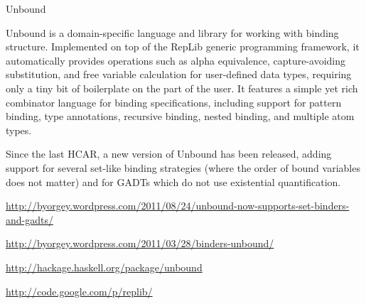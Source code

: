 \begin{hcarentry}[updated]{Unbound}
\makeheader

Unbound is a domain-specific language and library for working with
binding structure.  Implemented on top of the RepLib generic
programming framework, it automatically provides operations such as
alpha equivalence, capture-avoiding substitution, and free variable
calculation for user-defined data types, requiring only a tiny bit of
boilerplate on the part of the user.  It features a simple yet rich
combinator language for binding specifications, including support for
pattern binding, type annotations, recursive binding, nested binding,
and multiple atom types.

Since the last HCAR, a new version of Unbound has been released,
adding support for several set-like binding strategies (where the
order of bound variables does not matter) and for GADTs which do
not use existential quantification.

\FurtherReading
\begin{compactitem}
\item \url{http://byorgey.wordpress.com/2011/08/24/unbound-now-supports-set-binders-and-gadts/}
\item \url{http://byorgey.wordpress.com/2011/03/28/binders-unbound/}
\item \url{http://hackage.haskell.org/package/unbound}
\item \url{http://code.google.com/p/replib/}
\end{compactitem}
\end{hcarentry}
